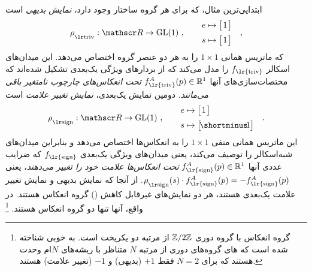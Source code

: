 ابتدایی‌ترین مثال، که برای هر گروه ساختار وجود دارد، \emph{نمایش بدیهی} است
\begin{align}
	\rhotriv: \Flip \to \GL{1}\ , \qquad 
	\begin{aligned}
		e &\mapsto \big[\mkern2mu 1 \mkern2mu\big] \\[2pt]
		s &\mapsto \big[\mkern2mu 1 \mkern2mu\big] \\
	\end{aligned}
	\quad ,
\end{align}
که ماتریس همانی ${1\!\times\!1}$ را به هر دو عنصر گروه اختصاص می‌دهد.
این میدان‌های اسکالر $f_{\textup{\lr{triv}}}$ را مدل می‌کند که از بردارهای ویژگی یک‌بعدی تشکیل شده‌اند که مختصات‌سازی‌های آنها $f^A_{\textup{\lr{triv}}}(p) \in \R^1$ \emph{تحت انعکاس‌های چارچوب نامتغیر باقی می‌مانند}.
دومین نمایش یک‌بعدی، \emph{نمایش تغییر علامت} است
\begin{align}
	\rhosign: \Flip \to \GL{1}\ , \qquad 
	\begin{aligned}
		e &\mapsto \big[\mkern2mu 1 \mkern2mu\big] \\[2pt]
		s &\mapsto \big[\! \shortminus\!1 \big]
	\end{aligned}
	\quad .
\end{align}
این ماتریس همانی منفی ${1\!\times\!1}$ را به انعکاس‌ها اختصاص می‌دهد و بنابراین میدان‌های شبه‌اسکالر را توصیف می‌کند، یعنی میدان‌های ویژگی یک‌بعدی $f_{\textup{\lr{sign}}}$ که ضرایب عددی آنها $f^A_{\textup{\lr{sign}}}(p) \in \R^1$ \emph{تحت انعکاس‌ها علامت خود را تغییر می‌دهند}، \mbox{یعنی} ${\rhosign(s)\cdot f^A_{\textup{\lr{sign}}}(p) = -f^A_{\textup{\lr{sign}}}(p)}$.
از آنجا که نمایش بدیهی و نمایش تغییر علامت یک‌بعدی هستند، هر دو نمایش‌های غیرقابل کاهش () گروه انعکاس هستند.
در واقع، آنها تنها دو  گروه انعکاس هستند.%
\footnote{
	گروه انعکاس با گروه دوری $\mathbb{Z}/2\mathbb{Z}$ از مرتبه دو یکریخت است.
	به خوبی شناخته شده است که های گروه‌های دوری از مرتبه $N$ متناظر با ریشه‌های $N$ام وحدت هستند که برای $N=2$ فقط $+1$ (بدیهی) و $-1$ (تغییر علامت) هستند.
}

